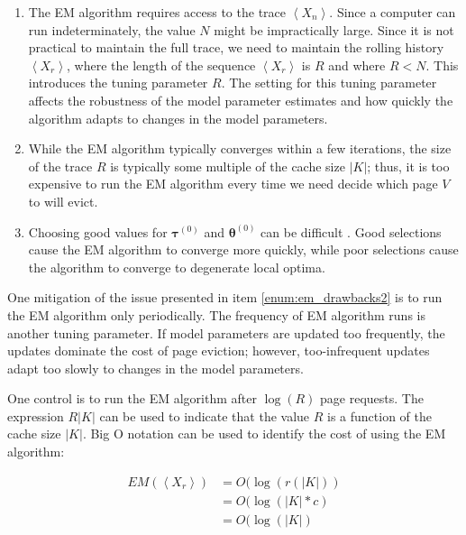   \begin{enumerate}
    \item
    \label{enum:em_drawbacks1}
    The EM algorithm requires access to the trace $\left< X_n \right>$. Since a
    computer can run indeterminately, the value $N$ might be impractically
    large. Since it is not practical to maintain the full trace, we need to
    maintain the rolling history $\left< X_r \right>$, where the length of the
    sequence $\left< X_r \right>$ is $R$ and where $R < N$. This introduces the
    tuning parameter $R$. The setting for this tuning parameter affects the
    robustness of the model parameter estimates and how quickly the algorithm
    adapts to changes in the model parameters.

    \item
    \label{enum:em_drawbacks2}
    While the EM algorithm typically converges within a few iterations, the size
    of the trace $R$ is typically some multiple of the cache size $|K|$; thus,
    it is too expensive to run the EM algorithm every time we need decide which
    page $V$ to will evict.

    \item
    \label{enum:em_drawbacks3}
    Choosing good values for $\bm{\tau}^{(0)}$ and $\bm{\theta}^{(0)}$ can be
    difficult \cite{karlis2003choosing}. Good selections cause the EM algorithm
    to converge more quickly, while poor selections cause the algorithm to
    converge to degenerate local optima.
  \end{enumerate}

  One mitigation of the issue presented in item \ref{enum:em_drawbacks2} is to
  run the EM algorithm only periodically. The frequency of EM algorithm runs is
  another tuning parameter. If model parameters are updated too frequently, the
  updates dominate the cost of page eviction; however, too-infrequent updates
  adapt too slowly to changes in the model parameters.

  One control is to run the EM algorithm after $\log(R)$ page requests. The
  expression $R|K|$ can be used to indicate that the value $R$ is a function of
  the cache size $|K|$. Big O notation can be used to identify the cost of using
  the EM algorithm:

  \begin{align*}
    EM(\left< X_r \right>)
      &= O(\log(r(|K|)) \\
      &= O(\log(|K| * c) \\
      &= O(\log(|K|)
  \end{align*}

